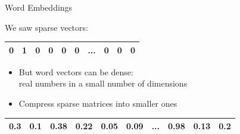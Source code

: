 \documentclass[professionalfonts, xcolor={usenames,svgnames,x11names,table}]{beamer}
\begin{document}
\unnumbered{

\begin{frame}[plain]
%
\centering
%
\huge{{\color{SkyBlue3!80!black}{Appendix}}}
%
\end{frame}
}


\begin{frame}{Word Embeddings}

We saw sparse vectors:

\begin{table}[]
\begin{tabular}{|l|l|l|l|l|l|l|l|l|l|}
\hline
0 & \alert{1} & 0 & 0 & 0 & 0 & ... & 0 & 0 & 0 \\ \hline
\end{tabular}
\end{table}

\pause
 \begin{itemize}   
          \item  But word vectors can be dense:\\
 real numbers in a small number of dimensions
\item Compress sparse matrices into smaller ones
 \end{itemize}
 
 \begin{table}[]
\begin{tabular}{|l|l|l|l|l|l|l|l|l|l|}
\hline
0.3 & 0.1 & \alert{0.38} & \alert{0.22} & 0.05 & 0.09 & ... & \alert{0.98} & 0.13 & 0.2\\ \hline
\end{tabular}
\end{table}
\end{frame}
\end{document}
